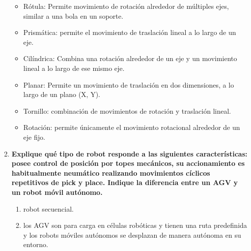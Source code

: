 \begin{enumerate}
    \begin{itemize}
        \item Rótula: Permite movimiento de rotación alrededor de múltiples ejes, similar a una bola en un soporte.
        \item Prismática: permite el movimiento de traslación lineal a lo largo de un eje. 
        \item Cilíndrica: Combina una rotación alrededor de un eje y un movimiento lineal a lo largo de ese mismo eje. 
        \item Planar: Permite un movimiento de traslación en dos dimensiones, a lo largo de un plano (X, Y).
        \item Tornillo: combinación de movimientos de rotación y traslación lineal.
        \item Rotación: permite únicamente el movimiento rotacional alrededor de un eje fijo.
    \end{itemize}

    \item \textbf{Explique qué tipo de robot responde a las siguientes características: posee control de posición por topes mecánicos, su accionamiento es habitualmente neumático realizando movimientos cíclicos repetitivos de pick y place. Indique la diferencia entre un AGV y un robot móvil autónomo.}
    
    \begin{enumerate}
        \item robot secuencial. 
        \item los AGV son para carga en células robóticas y tienen una ruta predefinida y los robots móviles autónomos se desplazan de manera autónoma en su entorno.

    \end{enumerate}

    


\end{enumerate}

